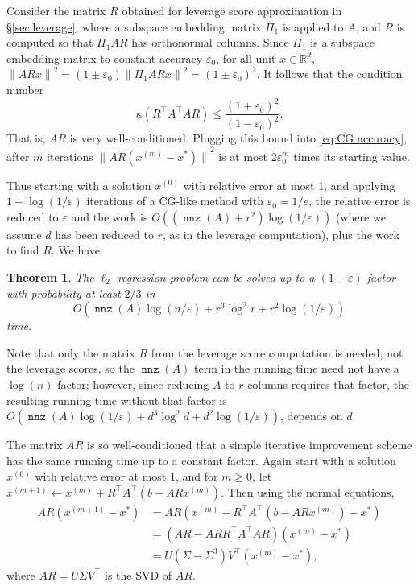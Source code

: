 \documentclass{sig-alternate}
\newcommand{\norm}[1]{{\| #1 \|}}
\DeclareMathOperator{\nnz}{\mathtt{nnz}}
\newcommand{\eps}{\varepsilon}
\newcommand{\R}{{\mathbb R}}
\newtheorem{theorem}{Theorem}
\begin{document}
Consider the matrix $R$ obtained for leverage score approximation
in \S\ref{sec:leverage}, where a subspace embedding matrix $\Pi_1$
is applied to $A$, and $R$ is computed so that $\Pi_1 A R$  has
orthonormal columns. Since $\Pi_1$ is a subspace
embedding matrix to constant accuracy $\eps_0$,
for all unit $x\in\R^d$,
$\norm{ARx}^2=(1\pm\eps_0)\norm{\Pi_1 ARx}^2= (1\pm \eps_0)^2$.
It follows that the condition number
\[
\kappa(R^\top A^\top A R)
	\le \frac{(1+\eps_0)^2}{(1-\eps_0)^2}.
\]
That is, $AR$ is very well-conditioned. Plugging this
bound into \eqref{eq:CG accuracy}, after $m$ iterations
$\norm{AR(x^{(m)} - x^*)}^2$ is at most $2\eps_0^m$
times its starting value.

Thus starting with a solution $x^{(0)}$ with 
relative error at most 1, and applying $1+\log(1/\eps)$ iterations
of a CG-like method with $\eps_0 = 1/e$, the relative error is reduced to $\eps$
and the work is $O((\nnz(A)+ r^2)\log(1/\eps))$
(where we assume $d$ has been reduced to $r$, as in the leverage computation),
plus the work to find $R$. We have
\fi

\begin{theorem}\label{thm:it reg}
The $\ell_2$-regression problem can be solved up to a $(1+\eps)$-factor with probability at least 
$2/3$ in
\[
O(\nnz(A)\log (n/\eps) + r^3 \log^2 r + r^2\log(1/\eps))
\]
time.
\end{theorem}

\ifSTOC\else

Note that only the matrix $R$ from the leverage score computation is needed, not
the leverage scores, so the $\nnz(A)$ term in the running time 
need not have a $\log(n)$
factor; however, since reducing $A$ to $r$ columns requires that factor,
the resulting running time without that factor
is $O(\nnz(A)\log(1/\eps) + d^3\log^2 d + d^2\log(1/\eps))$,
depends on $d$.


The matrix $AR$ is so well-conditioned that a simple iterative improvement scheme
has the same running time up to a constant factor. Again start with a solution $x^{(0)}$ with 
relative error at most 1, and for $m\ge 0$,
let $x^{(m+1)} \gets x^{(m)} + R^\top A^\top (b - ARx^{(m)})$.
Then using the normal equations,
\begin{align*}
AR(x^{(m+1)} - x^*)
	  & = AR(x^{(m)} + R^\top A^\top (b - AR x^{(m)}) - x^*)
	\\ & = (AR - ARR^\top A^\top AR ) (x^{(m)} - x^*)
	\\ & = U(\Sigma - \Sigma^3)V^\top (x^{(m)} - x^*),
\end{align*}
where $AR=U \Sigma V^\top$ is the SVD of $AR$.
\end{document}
